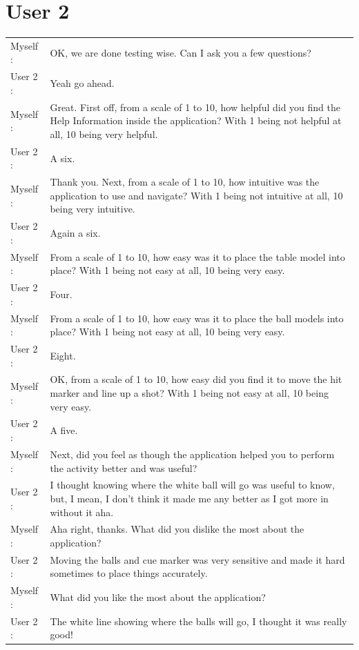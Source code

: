 \documentclass[ %
                author={Finn Alexander Wilkinson},
                supervisor={Dr. Andrew Calway},
                degree={MEng},
                title={\centering A Mixed Reality Aim Assistant for Pool and Snooker},
                subtitle={},
                type={Enterprise},
                year={2021} ]{dissertation}
\begin{document}
\section{User 2}
\begin{tabular}{l p{130mm}}
    Myself : & OK, we are done testing wise. Can I ask you a few questions? \\
    User 2 : & Yeah go ahead.\\
    Myself : & Great. First off, from a scale of 1 to 10, how helpful did you find the Help Information inside the application? With 1 being not helpful at all, 10 being very helpful. \\
    User 2 : & A six.\\
    Myself : & Thank you. Next, from a scale of 1 to 10, how intuitive was the application to use and navigate? With 1 being not intuitive at all, 10 being very intuitive.\\
    User 2 : & Again a six.\\
    Myself : & From a scale of 1 to 10, how easy was it to place the table model into place? With 1 being not easy at all, 10 being very easy.\\
    User 2 : & Four.\\
    Myself : & From a scale of 1 to 10, how easy was it to place the ball models into place? With 1 being not easy at all, 10 being very easy.\\ 
    User 2 : & Eight.\\
    Myself : & OK, from a scale of 1 to 10, how easy did you find it to move the hit marker and line up a shot? With 1 being not easy at all, 10 being very easy. \\
    User 2 : & A five.\\
    Myself : & Next, did you feel as though the application helped you to perform the activity better and was useful? \\
    User 2 : & I thought knowing where the white ball will go was useful to know, but, I mean, I don’t think it made me any better as I got more in without it aha.\\
    Myself : & Aha right, thanks. What did you dislike the most about the application? \\
    User 2 : & Moving the balls and cue marker was very sensitive and made it hard sometimes to place things accurately.\\
    Myself : & What did you like the most about the application? \\
    User 2 : & The white line showing where the balls will go, I thought it was really good!\\

\end{tabular}
\end{document}
